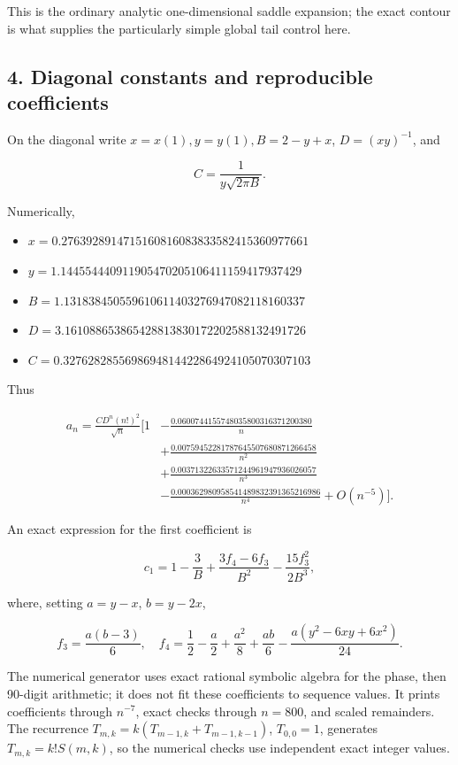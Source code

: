 \documentclass[11pt,letterpaper]{article}
\providecommand{\tightlist}{\setlength{\itemsep}{0pt}\setlength{\parskip}{0pt}}
\numberwithin{equation}{subsection}
\theoremstyle{definition}
\theoremstyle{remark}
\theoremstyle{plain}
\begin{document}
This is the ordinary analytic one-dimensional saddle expansion; the exact contour is what supplies the particularly simple global tail control here.

\subsection{4. Diagonal constants and reproducible coefficients}\label{a122:diagonal-constants-and-reproducible-coefficients}

On the diagonal write \(x=x(1),y=y(1),B=2-y+x\), \(D=(xy)^{-1}\), and

\[
 C=\frac1{y\sqrt{2\pi B}}.
\]

Numerically,

\begin{itemize}
\tightlist
\item
  \(x=0.2763928914715160816083833582415360977661\)
\item
  \(y=1.144554440911905470205106411159417937429\)
\item
  \(B=1.131838450559610611403276947082118160337\)
\item
  \(D=3.161088653865428813830172202588132491726\)
\item
  \(C=0.3276282855698694814422864924105070307103\)
\end{itemize}

Thus

\[
\begin{aligned}
 a_n=\frac{C D^n(n!)^2}{\sqrt n}\Bigg[1
 &-\frac{0.0600744155748035800316371200380}{n}\\
 &+\frac{0.00759452281787645507680871266458}{n^2}\\
 &+\frac{0.00371322633571244961947936026057}{n^3}\\
 &-\frac{0.000362980958541489832391365216986}{n^4}
 +O(n^{-5})\Bigg].
\end{aligned}\tag{4.1}
\]

An exact expression for the first coefficient is

\[
 c_1=1-\frac3B+\frac{3f_4-6f_3}{B^2}-\frac{15f_3^2}{2B^3},\tag{4.2}
\]

where, setting \(a=y-x\), \(b=y-2x\),

\[
 f_3=\frac{a(b-3)}6,
\quad f_4=\frac12-\frac a2+\frac{a^2}8+\frac{ab}6
 -\frac{a(y^2-6xy+6x^2)}{24}.
\]

The numerical generator uses exact rational symbolic algebra for the phase, then 90-digit arithmetic; it does not fit these coefficients to sequence values. It prints coefficients through \(n^{-7}\), exact checks through \(n=800\), and scaled remainders. The recurrence \(T_{m,k}=k(T_{m-1,k}+T_{m-1,k-1})\), \(T_{0,0}=1\), generates \(T_{m,k}=k!S(m,k)\), so the numerical checks use independent exact integer values.
\end{document}
